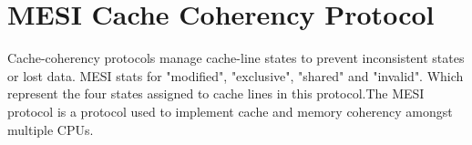 \documentclass{article}
\begin{document}






    

\section{MESI Cache Coherency Protocol}

Cache-coherency protocols manage cache-line states to prevent
inconsistent states or lost data. MESI stats for "modified",
"exclusive", "shared" and "invalid". Which represent the four states
assigned to cache lines in this protocol.The MESI protocol is a
protocol used to implement cache and memory coherency amongst multiple
CPUs. \cite{Birdetal2001}
\end{document}
